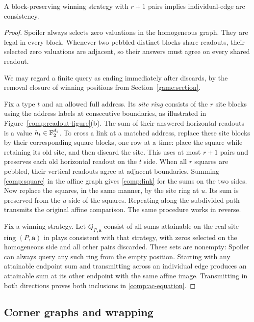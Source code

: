 \begin{lemma}\label{comp:necessity}
A block-preserving winning strategy with $r+1$ pairs implies
individual-edge arc consistency.
\end{lemma}
\begin{proof}
Spoiler always selects zero valuations in the homogeneous graph.  They
are legal in every block.  Whenever two pebbled distinct blocks share
readouts, their selected zero valuations are adjacent, so their answers
must agree on every shared readout.

We may regard a finite query as ending immediately after discards, by
the removal closure of winning positions from Section~\ref{game:section}.

Fix a type $t$ and an allowed full address.  Its \emph{site ring} consists
of the $r$ site blocks using the address labels at consecutive boundaries,
as illustrated in Figure~\ref{comp:readout-figure}(b).
The sum of their answered horizontal readouts is a value
$h_t\in\mathbb{F}_2^{d_t}$.  To cross a link at a matched address, replace these
site blocks by their corresponding square blocks, one row at a time:
place the square while retaining its old site, and then discard the
site.  This uses at most $r+1$ pairs and preserves each old horizontal
readout on the $t$ side.  When all $r$ squares are pebbled, their vertical
readouts agree at adjacent boundaries.  Summing \eqref{comp:square} in
the affine graph gives \eqref{comp:link} for the sums on the two sides.
Now replace the squares, in the same manner, by the site ring at $u$.
Its sum is preserved from the $u$ side of the squares.  Repeating along
the subdivided path transmits the original affine comparison.  The same
procedure works in reverse.

Fix a winning strategy.  Let $Q_{P,\mathbf a}$ consist of all sums
attainable on the real site ring $(P,\mathbf a)$ in plays consistent with
that strategy, with zeros selected on the homogeneous side and all other
pairs discarded.  These sets are nonempty: Spoiler can always query any
such ring from the empty position.  Starting with any attainable endpoint
sum and transmitting across an individual edge produces an attainable
sum at its other endpoint with the same affine image.  Transmitting in
both directions proves both inclusions in \eqref{comp:ac-equation}.
\end{proof}

\subsection{Corner graphs and wrapping}

